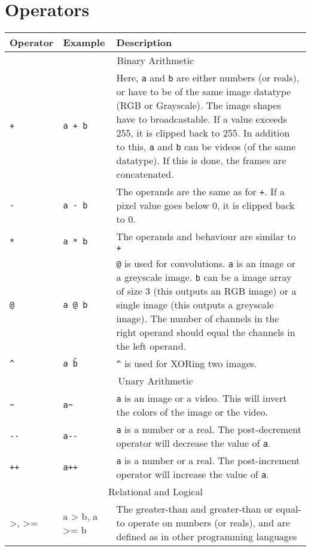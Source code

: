 \documentclass[a4paper, 11pt]{article}
\begin{document}
\section{Operators}
\begin{tabular}{ |p{3cm}|p{5cm}|p{7cm}|  }
  \hline
  Operator & Example & Description\\
  \hline
  \multicolumn{3}{|c|}{Binary Arithmetic} \\
  \hline
  \texttt{+} & \texttt{a + b} & Here, \texttt{a} and \texttt{b} are either numbers (or reals), or have to be of the same image datatype (RGB or Grayscale). The image shapes have to broadcastable. If a value exceeds 255, it is clipped back to 255. In addition to this, \texttt{a} and \texttt{b} can be videos (of the same datatype). If this is done, the frames are concatenated.\\ \hline
  \texttt{-} & \texttt{a - b} & The operands are the same as for \texttt{+}. If a pixel value goes below 0, it is clipped back to 0.\\ \hline
  \texttt{*} & \texttt{a * b} & The operands and behaviour are similar to \texttt{+} \\ \hline
  \texttt{@} & \texttt{a @ b} & \texttt{@} is used for convolutions. \texttt{a} is an image or a greyscale image. \texttt{b} can be a image array of size 3 (this outputs an RGB image) or a single image (this outputs a greyscale image). The number of channels in the right operand should equal the channels in the left operand. \\
  \texttt{\^} & \texttt{a \^ b} & \texttt{\^} is used for XORing two images. \\ \hline 
  \hline
  \multicolumn{3}{|c|}{Unary Arithmetic} \\
  \hline
  \texttt{\~} & \texttt{a\~} & \texttt{a} is an image or a video. This will invert the colors of the image or the video. \\ \hline
  \texttt{-{}-} & \texttt{a-{}-} & \texttt{a} is a number or a real. The post-decrement operator will decrease the value of \texttt{a}. \\ \hline
  \texttt{++} & \texttt{a++} & \texttt{a} is a number or a real. The post-increment operator will increase the value of \texttt{a}. \\ \hline
  \multicolumn{3}{|c|}{Relational and Logical} \\
  \hline
  >, >= & a > b, a >= b &  The greater-than and greater-than or equal-to operate on numbers (or reals), and are defined as in other programming languages \\  \hline

\end{tabular}
\end{document}

